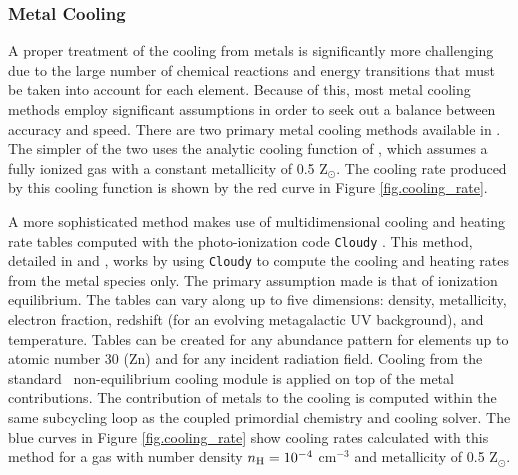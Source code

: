 \subsubsection{Metal Cooling}

A proper treatment of the cooling from metals is significantly more
challenging due to the large number of chemical reactions and energy
transitions that must be taken into account for each element.  Because
of this, most metal cooling methods employ significant assumptions in
order to seek out a balance between accuracy and speed.  There are two
primary metal cooling methods available in \enzo.  The simpler of the
two uses the analytic cooling function of \citet{SW87}, which assumes
a fully ionized gas with a constant metallicity of 0.5 Z$_{\odot}$.
The cooling rate produced by this cooling function is shown by the red 
curve in Figure \ref{fig.cooling_rate}.

A more sophisticated method makes use of multidimensional cooling and
heating rate tables computed with the photo-ionization code
\texttt{Cloudy} \citep{1998PASP..110..761F}.  This method, detailed in
\citet{2008MNRAS.385.1443S} and \citet{2011ApJ...731....6S}, works by
using \texttt{Cloudy} to compute the cooling and heating rates from
the metal species only.  The primary assumption made is that of
ionization equilibrium.  The tables can vary along up to five dimensions:
density, metallicity, electron fraction,
redshift (for an evolving metagalactic UV background), and
temperature.  Tables can be created for any abundance pattern for
elements up to atomic number 30 (Zn) and for any incident radiation
field.  Cooling from the standard \enzo\ non-equilibrium cooling module is
applied on top of the metal contributions.  The contribution of metals
to the cooling is computed within the same subcycling loop as the
coupled primordial chemistry and cooling solver.  The blue curves in
Figure \ref{fig.cooling_rate} show cooling rates calculated with this
method for a gas with number density $n_{\rm H} = 10^{-4}$ cm$^{-3}$ and
metallicity of 0.5 Z$_{\odot}$.

